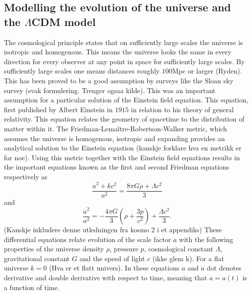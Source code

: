\subsection{Modelling the evolution of the universe and the $\Lambda$CDM model}
The cosmological principle states that on sufficiently
large scales the universe is isotropic and homogenous. This means the universe
looks the same in every direction for every observer at any point in space for
sufficiently large scales. By sufficiently large scales one means
distances roughly $100$Mpc or larger (Ryden). This has been proved to be a good
assumption by surveys like the Sloan sky survey (svak formulering. Trenger ogsaa kilde). This was an important assumption
for a particular solution of the Einstein field equation. This equation, first published by
Albert Einstein in $1915$ in relation to his theory of general relativity. This equation
relates the geometry of spacetime to the distribution of matter within it.
The Friedman-Lemaître-Robertson-Walker metric, which assumes the universe is
homogenous, isotropic and expanding provides an analytical solution to the
Einstein equation (kanskje forklare hva en metrikk er for noe). Using this
metric together with the Einstein field equations results in the important
equations known as the first and second Friedman equations respectively as
\begin{equation}
    \frac{\dot{a}^2 + kc^2}{a^2} = \frac{8\pi G\rho + \Lambda c^2}{3}
\end{equation}
and
\begin{equation}
    \frac{\ddot{a}^2}{a^2} = -\frac{4\pi G}{3}(\rho + \frac{3p}{c^2}) + \frac{\Lambda c^2}{3}.
\end{equation}
(Kanskje inkludere denne utledningen fra kosmo 2 i et appendiks)
These differential equations relate evolution of the scale factor $a$ with the
following properties of the universe density $\rho$, pressure $p$, cosmological constant $\Lambda$, gravitational
constant $G$ and the speed of light $c$ (ikke glem k). For a flat universe $k=0$
(Hva er et flatt univers). In these equations $\dot{a}$ and $\ddot{a}$ dot denotes
derivative and double derivative with respect to time, meaning that $a=a(t)$ is a
function of time. \\

